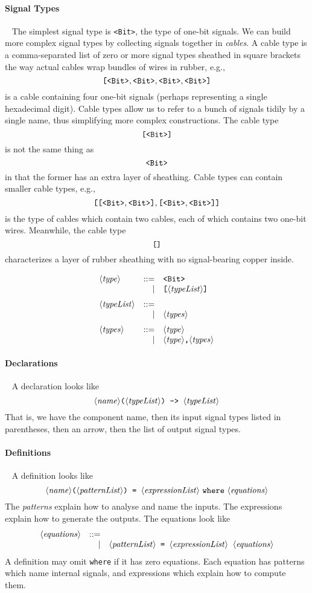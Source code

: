 \documentclass{article}
\begin{document}
\paragraph{Signal Types}~ The simplest signal type is \texttt{<Bit>},
the type of one-bit signals. We can build more complex signal types
by collecting signals together in \emph{cables}. A cable type is a
comma-separated list of zero or more signal types sheathed in square
brackets the way actual cables wrap bundles of wires in rubber, e.g.,
\[
  \texttt{[}\texttt{<Bit>},\texttt{<Bit>},\texttt{<Bit>},\texttt{<Bit>}\texttt{]}
\]
is a cable containing four one-bit signals (perhaps representing a
single hexadecimal digit). Cable types allow us to refer to a
bunch of signals tidily by a single name, thus simplifying more complex
constructions. The cable type
\[
  \texttt{[}\texttt{<Bit>}\texttt{]}
\]
is not the same thing as
\[
  \texttt{<Bit>}
\]
in that the former has an extra layer of sheathing. Cable types
can contain smaller cable types, e.g.,
\[
  \texttt{[}\texttt{[}\texttt{<Bit>},\texttt{<Bit>}\texttt{]},\texttt{[}\texttt{<Bit>},\texttt{<Bit>}\texttt{]}\texttt{]}
\]
is the type of cables which contain two cables, each of which contains
two one-bit wires. Meanwhile, the cable type
\[
  \texttt{[}\texttt{]}
\]
characterizes a layer of rubber sheathing with no signal-bearing
copper inside.

\[\begin{array}{lrl}
    \NT{type} & ::= & \Bit \\
              &   | & \cab{\NT{typeList}} \medskip\\
    \NT{typeList} & ::= & \\
              &   | & \NT{types}  \medskip\\
    \NT{types} & ::= & \NT{type} \\
               &   | & \NT{type}\texttt{,}\NT{types}
\end{array} \]

\paragraph{Declarations}~ A declaration looks like
\[
  \langle\mathit{name}\rangle\texttt{(}\langle\mathit{typeList}\rangle\texttt{)}\texttt{~->~}\langle\mathit{typeList}\rangle
\]
That is, we have the component name, then its input signal types
listed in parentheses, then an arrow, then the list of output
signal types.

\paragraph{Definitions}~ A definition looks like
\[
  \langle\mathit{name}\rangle\texttt{(}\langle\mathit{patternList}\rangle\texttt{)}\texttt{~=~}\langle\mathit{expressionList}\rangle
    ~\texttt{where}~\langle\mathit{equations}\rangle
  \]
The \emph{patterns} explain how to analyse and name the inputs.
The expressions explain how to generate the outputs. The equations
look like
\[\begin{array}{lrl}
    \langle\mathit{equations}\rangle & ::= &  \\
              &   | & \langle\mathit{patternList}\rangle\texttt{~=~}\langle\mathit{expressionList}\rangle\;\;  \langle\mathit{equations}\rangle
\end{array}
\]
A definition may omit \texttt{where} if it has zero equations. Each
equation has patterns which name internal signals, and expressions
which explain how to compute them.
\end{document}
